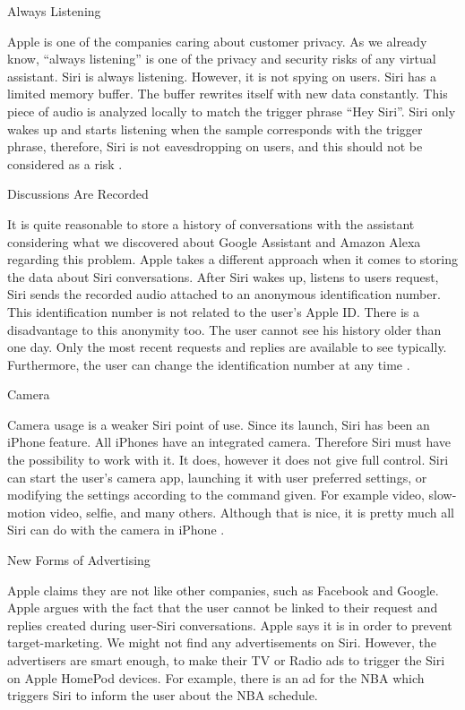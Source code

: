 \documentclass[
  digital, %
  oneside, %
  table,   %
  lof,     %
  lot,     %
]{fithesis3}
\begin{document}
\begin{compactitem}
  \item Always Listening
  
Apple is one of the companies caring about customer privacy. As we already know, ``always listening'' is one of the privacy and security risks of any virtual assistant. Siri is always listening. However, it is not spying on users. Siri has a limited memory buffer. The buffer rewrites itself with new data constantly. This piece of audio is analyzed locally to match the trigger phrase ``Hey Siri''. Siri only wakes up and starts listening when the sample corresponds with the trigger phrase, therefore, Siri is not eavesdropping on users, and this should not be considered as a risk \parencite{siri_listening}.

  \item Discussions Are Recorded
  
It is quite reasonable to store a history of conversations with the assistant considering what we discovered about Google Assistant and Amazon Alexa regarding this problem. Apple takes a different approach when it comes to storing the data about Siri conversations. After Siri wakes up, listens to users request, Siri sends the recorded audio attached to an anonymous identification number. This identification number is not related to the user's Apple ID. There is a disadvantage to this anonymity too. The user cannot see his history older than one day. Only the most recent requests and replies are available to see typically. Furthermore, the user can change the identification number at any time \parencite{siri_recordings}.

  \item Camera
  
Camera usage is a weaker Siri point of use. Since its launch, Siri has been an iPhone feature. All iPhones have an integrated camera. Therefore Siri must have the possibility to work with it. It does, however it does not give full control. Siri can start the user's camera app, launching it with user preferred settings, or modifying the settings according to the command given. For example video, slow-motion video, selfie, and many others. Although that is nice, it is pretty much all Siri can do with the camera in iPhone \parencite{siri_camera}.
  
  \item New Forms of Advertising
  
Apple claims they are not like other companies, such as Facebook and Google. Apple argues with the fact that the user cannot be linked to their request and replies created during user-Siri conversations. Apple says it is in order to prevent target-marketing. We might not find any advertisements on Siri. However, the advertisers are smart enough, to make their TV or Radio ads to trigger the Siri on Apple HomePod devices. For example, there is an ad for the NBA which triggers Siri to inform the user about the NBA schedule.


\end{compactitem}
\end{document}
